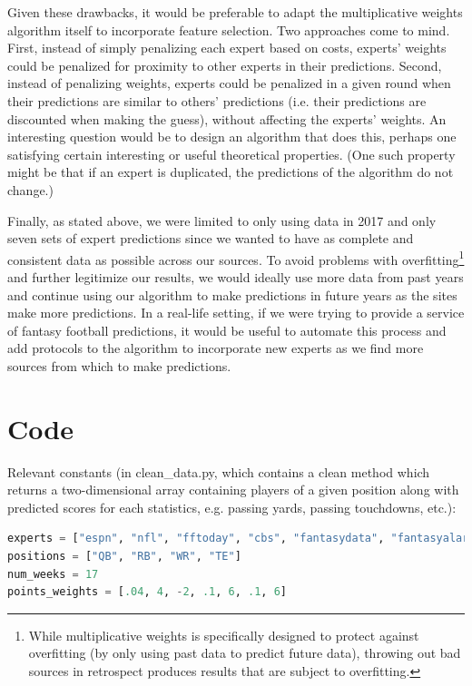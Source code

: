 \documentclass[12pt, final, onecolumn, titlepage]{article}
\theoremstyle{definition}
\begin{document}
Given these drawbacks, it would be preferable to adapt the multiplicative weights algorithm itself to incorporate feature selection. Two approaches come to mind. First, instead of simply penalizing each expert based on costs, experts' weights could be penalized for proximity to other experts in their predictions. Second, instead of penalizing weights, experts could be penalized in a given round when their predictions are similar to others' predictions (i.e. their predictions are discounted when making the guess), without affecting the experts' weights. An interesting question would be to design an algorithm that does this, perhaps one satisfying certain interesting or useful theoretical properties. (One such property might be that if an expert is duplicated, the predictions of the algorithm do not change.)

Finally, as stated above, we were limited to only using data in 2017 and only seven sets of expert predictions since we wanted to have as complete and consistent data as possible across our sources. To avoid problems with overfitting\footnote{While multiplicative weights is specifically designed to protect against overfitting (by only using past data to predict future data), throwing out bad sources in retrospect produces results that are subject to overfitting.} and further legitimize our results, we would ideally use more data from past years and continue using our algorithm to make predictions in future years as the sites make more predictions. In a real-life setting, if we were trying to provide a service of fantasy football predictions, it would be useful to automate this process and add protocols to the algorithm to incorporate new experts as we find more sources from which to make predictions.
\newpage
\appendix
\section{Code}
Relevant constants (in clean\_data.py, which contains a clean method which returns a two-dimensional array containing players of a given position along with predicted scores for each statistics, e.g. passing yards, passing touchdowns, etc.):

\footnotesize
\begin{lstlisting}[basicstyle=\small\ttfamily,breaklines=true,breakatwhitespace=true,language=Python]
experts = ["espn", "nfl", "fftoday", "cbs", "fantasydata", "fantasyalarm", "yahoo"]
positions = ["QB", "RB", "WR", "TE"]
num_weeks = 17
points_weights = [.04, 4, -2, .1, 6, .1, 6]
\end{lstlisting}
\end{document}
